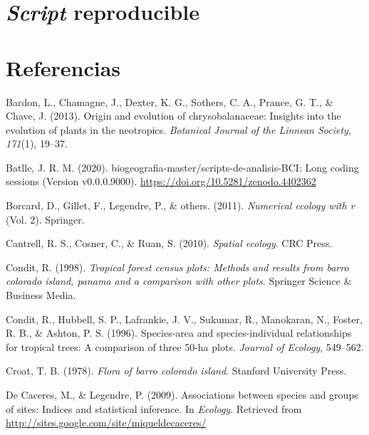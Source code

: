 \documentclass[11pt,]{article}
\begin{document}
\section{\texorpdfstring{\emph{Script}
reproducible}{Script reproducible}}\label{script-reproducible}

\section*{Referencias}\label{referencias}

\hypertarget{refs}{}
\hypertarget{ref-bardon2013origin}{}
Bardon, L., Chamagne, J., Dexter, K. G., Sothers, C. A., Prance, G. T.,
\& Chave, J. (2013). Origin and evolution of chrysobalanaceae: Insights
into the evolution of plants in the neotropics. \emph{Botanical Journal
of the Linnean Society}, \emph{171}(1), 19--37.

\hypertarget{ref-jose_ramon_martinez_batlle_2020_4402362}{}
Batlle, J. R. M. (2020). biogeografia-master/scripts-de-analisis-BCI:
Long coding sessions (Version v0.0.0.9000).
\url{https://doi.org/10.5281/zenodo.4402362}

\hypertarget{ref-borcard2011numerical}{}
Borcard, D., Gillet, F., Legendre, P., \& others. (2011).
\emph{Numerical ecology with r} (Vol. 2). Springer.

\hypertarget{ref-cantrell2010spatial}{}
Cantrell, R. S., Cosner, C., \& Ruan, S. (2010). \emph{Spatial ecology}.
CRC Press.

\hypertarget{ref-condit1998tropical}{}
Condit, R. (1998). \emph{Tropical forest census plots: Methods and
results from barro colorado island, panama and a comparison with other
plots}. Springer Science \& Business Media.

\hypertarget{ref-condit1996species}{}
Condit, R., Hubbell, S. P., Lafrankie, J. V., Sukumar, R., Manokaran,
N., Foster, R. B., \& Ashton, P. S. (1996). Species-area and
species-individual relationships for tropical trees: A comparison of
three 50-ha plots. \emph{Journal of Ecology}, 549--562.

\hypertarget{ref-croat1978flora}{}
Croat, T. B. (1978). \emph{Flora of barro colorado island}. Stanford
University Press.

\hypertarget{ref-indicspeciesR}{}
De Caceres, M., \& Legendre, P. (2009). Associations between species and
groups of sites: Indices and statistical inference. In \emph{Ecology}.
Retrieved from \url{http://sites.google.com/site/miqueldecaceres/}
\end{document}
